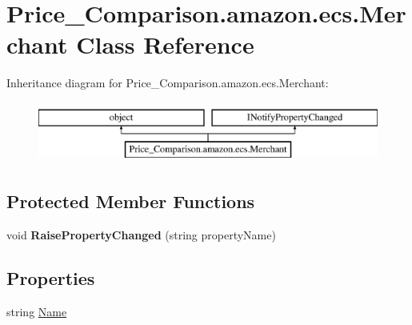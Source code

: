 \hypertarget{class_price___comparison_1_1amazon_1_1ecs_1_1_merchant}{\section{Price\-\_\-\-Comparison.\-amazon.\-ecs.\-Merchant Class Reference}
\label{class_price___comparison_1_1amazon_1_1ecs_1_1_merchant}
}


 


Inheritance diagram for Price\-\_\-\-Comparison.\-amazon.\-ecs.\-Merchant\-:\begin{figure}[H]
\begin{center}
\leavevmode
\includegraphics[height=2.000000cm]{class_price___comparison_1_1amazon_1_1ecs_1_1_merchant}
\end{center}
\end{figure}
\subsection*{Protected Member Functions}
\begin{DoxyCompactItemize}
\item 
\hypertarget{class_price___comparison_1_1amazon_1_1ecs_1_1_merchant_ab51b6abda84a0745d7feedefaf691325}{void {\bfseries Raise\-Property\-Changed} (string property\-Name)}\label{class_price___comparison_1_1amazon_1_1ecs_1_1_merchant_ab51b6abda84a0745d7feedefaf691325}

\end{DoxyCompactItemize}
\subsection*{Properties}
\begin{DoxyCompactItemize}
\item 
\hypertarget{class_price___comparison_1_1amazon_1_1ecs_1_1_merchant_a4297e7df5831606ea4a0d013a9d01925}{string \hyperlink{class_price___comparison_1_1amazon_1_1ecs_1_1_merchant_a4297e7df5831606ea4a0d013a9d01925}{Name}}\label{class_price___comparison_1_1amazon_1_1ecs_1_1_merchant_a4297e7df5831606ea4a0d013a9d01925}

\begin{DoxyCompactList}\small\item\em \end{DoxyCompactList}\end{DoxyCompactItemize}
